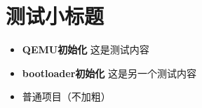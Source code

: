 \documentclass{article}
\newcommand{\subtitle}[1]{\item \textbf{#1}}
\begin{document}
\section{测试小标题}

\begin{itemize}
    \subtitle{QEMU初始化} 这是测试内容
    \subtitle{bootloader初始化} 这是另一个测试内容
    \item 普通项目（不加粗）
\end{itemize}
\end{document}
